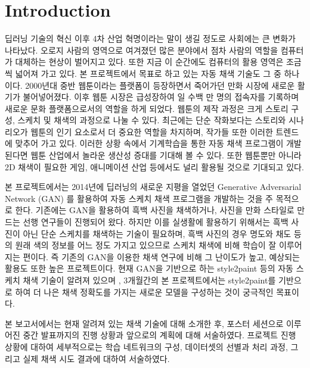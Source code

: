 \section{Introduction}

딥러닝 기술의 혁신 이후 4차 산업 혁명이라는 말이 생길 정도로 사회에는 큰 변화가 나타났다. 
오로지 사람의 영역으로 여겨졌던 많은 분야에서 점차 사람의 역할을 컴퓨터가 대체하는 현상이 벌어지고 있다. 또한 지금 이 순간에도 컴퓨터의 활용 영역은 조금씩 넓어져 가고 있다. 
본 프로젝트에서 목표로 하고 있는 자동 채색 기술도 그 중 하나이다. 
2000년대 중반 웹툰이라는 플랫폼이 등장하면서 죽어가던 만화 시장에 새로운 활기가 불어넣어졌다. 
이후 웹툰 시장은 급성장하여 일 수백 만 명의 접속자를 기록하며 새로운 문화 플랫폼으로서의 역할을 하게 되었다. 
웹툰의 제작 과정은 크게 스토리 구성, 스케치 및 채색의 과정으로 나눌 수 있다.
최근에는 단순 작화보다는 스토리와 시나리오가 웹툰의 인기 요소로서 더 중요한 역할을 차지하며, 작가들 또한 이러한 트렌드에 맞추어 가고 있다.
이러한 상황 속에서 기계학습을 통한 자동 채색 프로그램이 개발된다면 웹툰 산업에서 놀라운 생산성 증대를 기대해 볼 수 있다. 
또한 웹툰뿐만 아니라 2D 채색이 필요한 게임, 애니메이션 산업 등에서도 널리 활용될 것으로 기대되고 있다.

본 프로젝트에서는 2014년에 딥러닝의 새로운 지평을 열었던 Generative Adversarial Network (GAN) \cite{Goodfellow2014} 를 활용하여 자동 스케치 채색 프로그램을 개발하는 것을 주 목적으로 한다. 
기존에는 GAN을 활용하여 흑백 사진을 채색하거나, 사진을 만화 스타일로 만드는 선행 연구들이 진행되어 왔다.
하지만 이를 실생활에 활용하기 위해서는 흑백 사진이 아닌 단순 스케치를 채색하는 기술이 필요하며, 흑백 사진의 경우 명도와 채도 등의 원래 색의 정보를 어느 정도 가지고 있으므로 스케치 채색에 비해 학습이 잘 이루어지는 편이다. 
즉 기존의 GAN을 이용한 채색 연구에 비해 그 난이도가 높고, 예상되는 활용도 또한 높은 프로젝트이다. 
현재 GAN을 기반으로 하는 style2paint 등의 자동 스케치 채색 기술이 알려져 있으며 \cite{Zhang2017}, 3개월간의 본 프로젝트에서는 style2paint를 기반으로 하여 더 나은 채색 정확도를 가지는 새로운 모델을 구성하는 것이 궁극적인 목표이다.

본 보고서에서는 현재 알려져 있는 채색 기술에 대해 소개한 후, 포스터 세션으로 이루어진 중간 발표까지의 진행 상황과 앞으로의 계획에 대해 서술하였다. 프로젝트 진행 상황에 대하여 세부적으로는 학습 네트워크의 구성, 데이터셋의 선별과 처리 과정, 그리고 실제 채색 시도 결과에 대하여 서술하였다.
